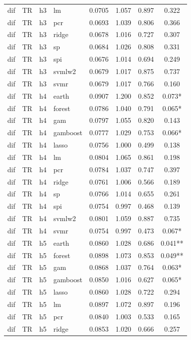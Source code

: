 \begin{ThreePartTable}
\begin{longtable}[t]{llclcccc}
dif & TR & h3 & lm & 0.0705 & 1.057 & 0.897 & 0.322\\
dif & TR & h3 & pcr & 0.0693 & 1.039 & 0.806 & 0.366\\
dif & TR & h3 & ridge & 0.0678 & 1.016 & 0.727 & 0.307\\
dif & TR & h3 & sp & 0.0684 & 1.026 & 0.808 & 0.331\\
dif & TR & h3 & spi & 0.0676 & 1.014 & 0.694 & 0.249\\
dif & TR & h3 & svmlw2 & 0.0679 & 1.017 & 0.875 & 0.737\\
dif & TR & h3 & svmr & 0.0679 & 1.017 & 0.766 & 0.160\\
\addlinespace
dif & TR & h4 & earth & 0.0907 & 1.200 & 0.852 & 0.073*\\
dif & TR & h4 & forest & 0.0786 & 1.040 & 0.791 & 0.065*\\
dif & TR & h4 & gam & 0.0797 & 1.055 & 0.820 & 0.143\\
dif & TR & h4 & gamboost & 0.0777 & 1.029 & 0.753 & 0.066*\\
dif & TR & h4 & lasso & 0.0756 & 1.000 & 0.499 & 0.138\\
dif & TR & h4 & lm & 0.0804 & 1.065 & 0.861 & 0.198\\
dif & TR & h4 & pcr & 0.0784 & 1.037 & 0.747 & 0.397\\
dif & TR & h4 & ridge & 0.0761 & 1.006 & 0.566 & 0.189\\
dif & TR & h4 & sp & 0.0766 & 1.014 & 0.655 & 0.261\\
dif & TR & h4 & spi & 0.0754 & 0.997 & 0.468 & 0.139\\
dif & TR & h4 & svmlw2 & 0.0801 & 1.059 & 0.887 & 0.735\\
dif & TR & h4 & svmr & 0.0754 & 0.997 & 0.473 & 0.067*\\
\addlinespace
dif & TR & h5 & earth & 0.0860 & 1.028 & 0.686 & 0.041**\\
dif & TR & h5 & forest & 0.0898 & 1.073 & 0.853 & 0.049**\\
dif & TR & h5 & gam & 0.0868 & 1.037 & 0.764 & 0.063*\\
dif & TR & h5 & gamboost & 0.0850 & 1.016 & 0.627 & 0.065*\\
dif & TR & h5 & lasso & 0.0860 & 1.028 & 0.722 & 0.294\\
dif & TR & h5 & lm & 0.0897 & 1.072 & 0.897 & 0.196\\
dif & TR & h5 & pcr & 0.0840 & 1.003 & 0.533 & 0.165\\
dif & TR & h5 & ridge & 0.0853 & 1.020 & 0.666 & 0.257\\

\end{longtable}
\end{ThreePartTable}
